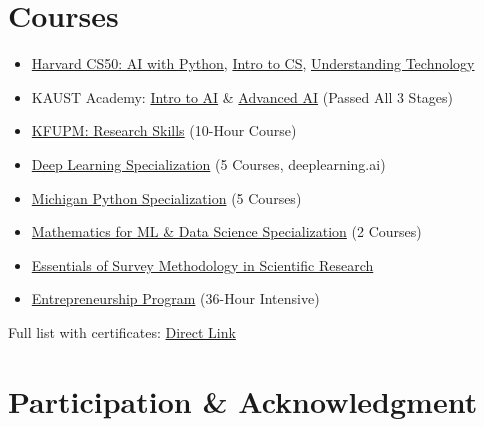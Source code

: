 \documentclass[a4paper,11pt]{article}
\begin{document}
\section{Courses}

\begin{itemize}
    \item \href{https://cs50.harvard.edu/certificates/34fb726e-df28-4e23-b51a-567465d2ba36}{Harvard CS50: AI with Python}, \href{https://cs50.harvard.edu/certificates/a7046c46-5173-4d85-9b46-4e80d49e9e5f}{Intro to CS}, \href{https://cs50.harvard.edu/certificates/a5b061d3-6096-4f6f-95f2-5abaf5068b45}{Understanding Technology}
    \item KAUST Academy: \href{https://drive.google.com/file/d/1PmtHOIsClAmkJRSYVuh4JTqRT2wR0jRy}{Intro to AI} \& \href{https://drive.google.com/file/d/1rHS5PM1B7ybo28bhWVvomUxvcA3THdSQ}{Advanced AI} (Passed All 3 Stages)
    \item \href{https://drive.google.com/file/d/1ac0k426s2n_2xGi4S_94i1GXu-SInNdP}{KFUPM: Research Skills} (10-Hour Course)
    \item \href{https://www.coursera.org/account/accomplishments/certificate/XBWLJMSRCNCS}{Deep Learning Specialization} (5 Courses, deeplearning.ai)
    \item \href{https://www.coursera.org/account/accomplishments/certificate/K9KVLDVQXKPH}{Michigan Python Specialization} (5 Courses)
    \item \href{https://www.coursera.org/account/accomplishments/certificate/ZNPZ3QTJP4DR}{Mathematics for ML \& Data Science Specialization} (2 Courses)
    \item \href{https://drive.google.com/file/d/1G_3iRQgpgv_3s9dKEcYYTLn4n6ER897o}{Essentials of Survey Methodology in Scientific Research}
    \item \href{https://drive.google.com/file/d/1Qld1C9ls_WXaPRMBtj52VcwJe99sWPue}{Entrepreneurship Program} (36-Hour Intensive)
\end{itemize}
\noindent Full list with certificates: \href{https://github.com/mah-sam/my_cv/blob/main/Mahmoud_Sameh_Certificates.pdf?raw=true}{Direct Link}

\section{Participation \& Acknowledgment}
\end{document}

